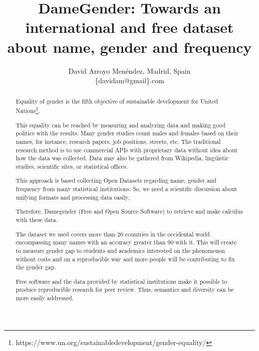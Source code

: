\documentclass[a4paper]{article}
\title{DameGender: Towards an international and free dataset about name, gender and frequency}
\author{
David Arroyo Menéndez, Madrid, Spain \\ \{davidam@gmail\}.com
}
\begin{document}
\maketitle

\begin{abstract}

  Equality of gender is the fifth objective of sustainable development
  for United
  Nations\footnote{https://www.un.org/sustainabledevelopment/gender-equality/}.

  This equality can be reached by measuring and analyzing data
  and making good politics with the results. Many gender studies
  count males and females based on their names, for
  instance, research papers, job positions, streets, etc. The
  traditional research method is to use commercial APIs with
  proprietary data without idea about how the data was collected.
  Data may also be gathered from Wikipedia, lingüistic studies,
  scientific sites, or statistical offices.


  This approach is based collecting Open Datasets regarding name,
  gender and frequency from many statistical institutions. So, we
  need a scientific discussion about unifying formats and processing
  data easily.

  Therefore, Damegender (Free and Open Source Software) to retrieve
  and make calculus with these data.


  The dataset we used covers more than 20 countries in the occidental
  world encompassing many names with an accuracy greater than 90%
  with it. This will create to measure gender gap to students and
  academics interested on the phenomenon without costs and on a
  reproducible way and more people will be contributing to fix the
  gender gap.


  Free software and the data provided by statistical institutions make
  it possible to produce reproducible research for peer review. Thus,
  semantics and diversity can be more easily addressed.
  
\end{abstract}
\end{document}
